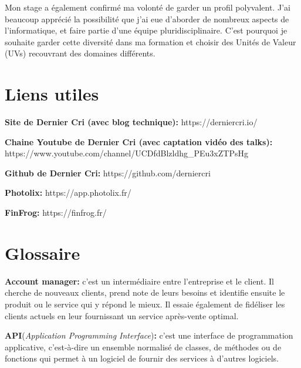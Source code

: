 \bigskip

Mon stage a également confirmé ma volonté de garder un profil
polyvalent. J'ai beaucoup apprécié la possibilité que j'ai eue d'aborder
de nombreux aspects de l'informatique, et faire partie d'une équipe
pluridisciplinaire. C'est pourquoi je souhaite garder cette diversité
dans ma formation et choisir des Unités de Valeur (UVs) recouvrant des
domaines différents.

\newpage

\section{Liens utiles}\label{liens-utiles}

\bigskip

\textbf{Site de Dernier Cri (avec blog technique):}
https://derniercri.io/

\bigskip

\textbf{Chaine Youtube de Dernier Cri (avec captation vidéo des talks):}
https://www.youtube.com/channel/UCDfdBlzldhg\_PEu3xZTPsHg

\bigskip

\textbf{Github de Dernier Cri:} https://github.com/derniercri

\bigskip

\textbf{Photolix:} https://app.photolix.fr/

\bigskip

\textbf{FinFrog:} https://finfrog.fr/

\newpage

\section{Glossaire}\label{glossaire}

\textbf{Account manager:} c'est un intermédiaire entre l'entreprise et
le client. Il cherche de nouveaux clients, prend note de leurs besoins
et identifie ensuite le produit ou le service qui y répond le mieux. Il
essaie également de fidéliser les clients actuels en leur fournissant un
service après-vente optimal.

\bigskip

\textbf{API}(\emph{Application Programming Interface})\textbf{:} c'est
une interface de programmation applicative, c'est-à-dire un ensemble
normalisé de classes, de méthodes ou de fonctions qui permet à un
logiciel de fournir des services à d'autres logiciels.

\bigskip

